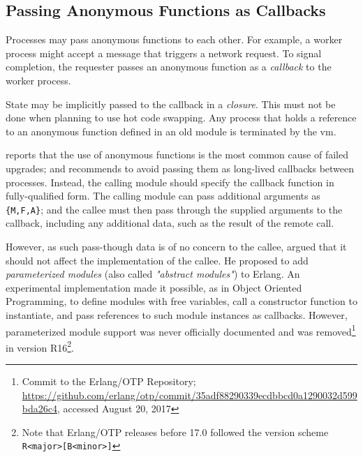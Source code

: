 \subsection{Passing Anonymous Functions as Callbacks}

Processes may pass anonymous functions to each other. For example, a worker process might accept a message that triggers a network request. To signal completion, the requester passes an anonymous function as a \emph{callback} to the worker process.

State may be implicitly passed to the callback in a \emph{closure}. This must not be done when planning to use hot code swapping. Any process that holds a reference to an anonymous function defined in an old module is terminated by the \acrshort{vm}.

\cite{davis:talk} reports that the use of anonymous functions is the most common cause of failed upgrades; and recommends to avoid passing them as long-lived callbacks between processes. Instead, the calling module should specify the callback function in fully-qualified form. The calling module can pass additional arguments as \lstinline|{M,F,A}|; and the callee must then pass through the supplied arguments to the callback, including any additional data, such as the result of the remote call.

However, as such pass-though data is of no concern to the callee, \cite{carlsson:parameterized} argued that it should not affect the implementation of the callee. He proposed to add \emph{parameterized modules} (also called \emph{"abstract modules"}) to Erlang. An experimental implementation made it possible, as in Object Oriented Programming, to define modules with free variables, call a constructor function to instantiate, and pass references to such module instances as callbacks.
However, parameterized module support was never officially documented and was removed\footnote{Commit to the Erlang/OTP Repository; \url{https://github.com/erlang/otp/commit/35adf88290339ecdbbcd0a1290032d599bda26c4}, accessed August 20, 2017} in version R16\footnote{Note that Erlang/OTP releases before 17.0 followed the version scheme \lstinline|R<major>[B<minor>]|}.
